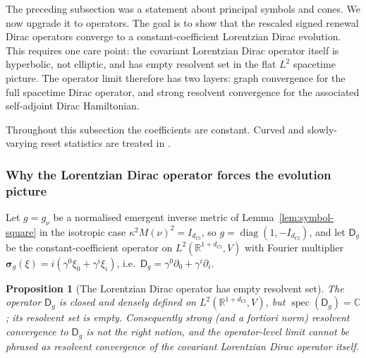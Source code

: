 \documentclass[11pt]{article}
\newtheorem{proposition}[theorem]{Proposition}
\theoremstyle{definition}
\theoremstyle{remark}
\newcommand{\R}{\mathbb{R}}
\newcommand{\C}{\mathbb{C}}
\newcommand{\dCl}{d_{\mathrm{Cl}}}
\newcommand{\spec}{\operatorname{spec}}
\newcommand{\sym}{\boldsymbol{\sigma}}
\newcommand{\Dirac}{\mathsf{D}}
\begin{document}
The preceding subsection was a statement about principal symbols and cones.  We
now upgrade it to operators.  The goal is to show that the rescaled signed
renewal Dirac operators converge to a constant-coefficient Lorentzian Dirac
evolution.  This requires one care point: the covariant Lorentzian Dirac
operator itself is hyperbolic, not elliptic, and has empty resolvent set in the
flat $L^2$ spacetime picture.  The operator limit therefore has two layers:
graph convergence for the full spacetime Dirac operator, and strong resolvent
convergence for the associated self-adjoint Dirac Hamiltonian.

Throughout this subsection the coefficients are constant.  Curved and
slowly-varying reset statistics are treated in .

\subsubsection{Why the Lorentzian Dirac operator forces the evolution picture}

Let $g=g_\nu$ be a normalised emergent inverse metric of Lemma~\ref{lem:symbol-square}
in the isotropic case $\kappa^2M(\nu)^2=I_{\dCl}$, so $g=\operatorname{diag}(1,-I_{\dCl})$,
and let $\Dirac_g$ be the constant-coefficient operator on
$L^2(\R^{1+\dCl},V)$ with Fourier multiplier $\sym_g(\xi)=i(\gamma^0\xi_0
+\gamma^i\xi_i)$, i.e.\ $\Dirac_g=\gamma^0\partial_0+\gamma^i\partial_i$.

\begin{proposition}[The Lorentzian Dirac operator has empty resolvent set]
\label{prop:empty-resolvent}
The operator $\Dirac_g$ is closed and densely defined on $L^2(\R^{1+\dCl},V)$, but
$\spec(\Dirac_g)=\C$; its resolvent set is empty.  Consequently strong (and
\emph{a fortiori} norm) resolvent convergence \emph{to} $\Dirac_g$ is not the
right notion, and the operator-level limit cannot be phrased as resolvent
convergence of the covariant Lorentzian Dirac operator itself.
\end{proposition}
\end{document}
